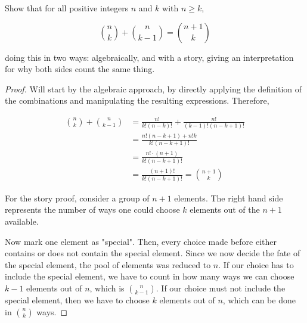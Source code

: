 \begin{exercise}{16}
    Show that for all positive integers $n$ and $k$ with $n \geq k$,

    $${n \choose k} + {n \choose k-1} = {n+1 \choose k}$$

    doing this in two ways: algebraically, and with a story, giving an interpretation for why both sides count the same thing.
\end{exercise}

\begin{proof}
    Will start by the algebraic approach, by directly applying the definition of the combinations and manipulating the resulting expressions. Therefore,

    \begin{align*}
        {n \choose k} + {n \choose k-1} &= \frac{n!}{k!(n-k)!} + \frac{n!}{(k-1)!(n-k+1)!} \\
        &= \frac{n!(n-k+1) + n!k}{k! (n-k+1)!} \\
        &= \frac{n! \cdot (n+1)}{k! (n-k+1)!} \\
        &= \frac{(n+1)!}{k! (n-k+1)!} = {n+1 \choose k}
    \end{align*}

    For the story proof, consider a group of $n+1$ elements. The right hand side represents the number of ways one could choose $k$ elements out of the $n+1$ available.
    
    Now mark one element as "special". Then, every choice made before either contains or does not contain the special element. Since we now decide the fate of the special element, the pool of elements was reduced to $n$. If our choice has to include the special element, we have to count in how many ways we can choose $k-1$ elements out of $n$, which is $n \choose k-1$. If our choice must not include the special element, then we have to choose $k$ elements out of $n$, which can be done in $n \choose k$ ways. 
\end{proof}


